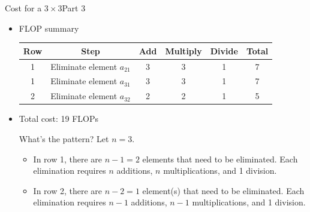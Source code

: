 \documentclass[10pt]{beamer}
\begin{document}
\begin{frame}{Cost for a $3\times 3$}{Part 3}
\begin{itemize}

\vspace{5mm}
\item FLOP summary
\begin{center}
\begin{tabular}{c c c c c c}\hline
 Row & Step & Add & Multiply & Divide & Total \\\hline
 1 &  Eliminate element $a_{21}$ & 3 & 3& 1 & 7\\
 1 &  Eliminate element $a_{31}$ & 3 & 3& 1 & 7\\
 2 &  Eliminate element $a_{32}$ & 2 & 2 & 1 & 5\\\hline
\end{tabular}
\end{center}
\vspace{5mm}
\item Total cost: 19 FLOPs

\begin{block}{What's the pattern?}
Let $n=3$. 
\begin{itemize}
    \item In row 1, there are $n-1=2$ elements that need to be eliminated. Each elimination requires $n$ additions, $n$ multiplications, and 1 division. 
    \item In row 2, there are $n-2=1$ element(s) that need to be eliminated. Each elimination requires $n-1$ additions, $n-1$ multiplications, and 1 division.
    
\end{itemize}
\end{block}
\end{itemize}
\end{frame}
\end{document}
